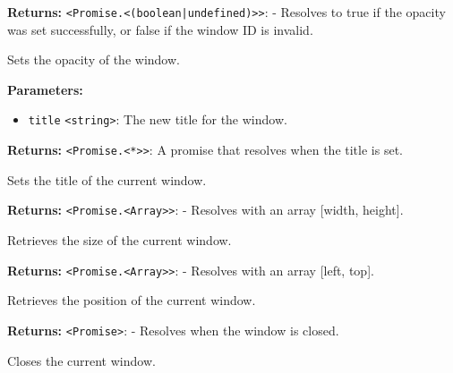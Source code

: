 \documentclass[12pt,a4paper]{article}
\begin{document}
\noindent \textbf{Returns:} \texttt{<Promise.<(boolean|undefined)>>}: - Resolves to \textasciigrave{}true\textasciigrave{} if the opacity was set successfully, or \textasciigrave{}false\textasciigrave{} if the window ID is invalid.

\noindent Sets the opacity of the window.

\vspace{5mm}
\noindent {}


\noindent \textbf{Parameters:}
\begin{itemize}
  \item \texttt{title} \texttt{<string>}: The new title for the window.
\end{itemize}

\noindent \textbf{Returns:} \texttt{<Promise.<*>>}: A promise that resolves when the title is set.

\noindent Sets the title of the current window.

\vspace{5mm}
\noindent {}


\noindent \textbf{Returns:} \texttt{<Promise.<Array>>}: - Resolves with an array [width, height].

\noindent Retrieves the size of the current window.

\vspace{5mm}
\noindent {}


\noindent \textbf{Returns:} \texttt{<Promise.<Array>>}: - Resolves with an array [left, top].

\noindent Retrieves the position of the current window.

\vspace{5mm}
\noindent {}


\noindent \textbf{Returns:} \texttt{<Promise>}: - Resolves when the window is closed.

\noindent Closes the current window.
\end{document}
